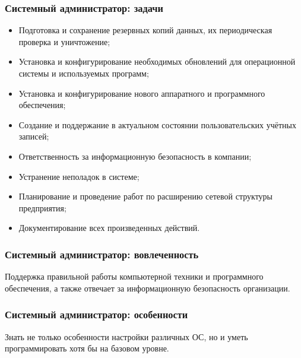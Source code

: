 \documentclass{../industrial-development}
\begin{document}
	\begin{frame} \frametitle{Системный администратор: задачи}
		\begin{itemize}
			\item Подготовка и сохранение резервных копий данных, их периодическая проверка и уничтожение;
			\item Установка и конфигурирование необходимых обновлений для операционной системы и используемых программ;
			\item Установка и конфигурирование нового аппаратного и программного обеспечения;
			\item Создание и поддержание в актуальном состоянии пользовательских учётных записей;
			\item Ответственность за информационную безопасность в компании;
			\item Устранение неполадок в системе;
			\item Планирование и проведение работ по расширению сетевой структуры предприятия;
			\item Документирование всех произведенных действий.
		\end{itemize}
	\end{frame}
	\begin{frame} \frametitle{Системный администратор: вовлеченность}
		Поддержка правильной работы компьютерной техники и программного обеспечения, а также отвечает за информационную безопасность организации.
	\end{frame}
	
	\begin{frame} \frametitle{Системный администратор: особенности}
		Знать не только особенности настройки различных ОС, но и уметь программировать хотя бы на базовом уровне.
	\end{frame}
	
\end{document}
